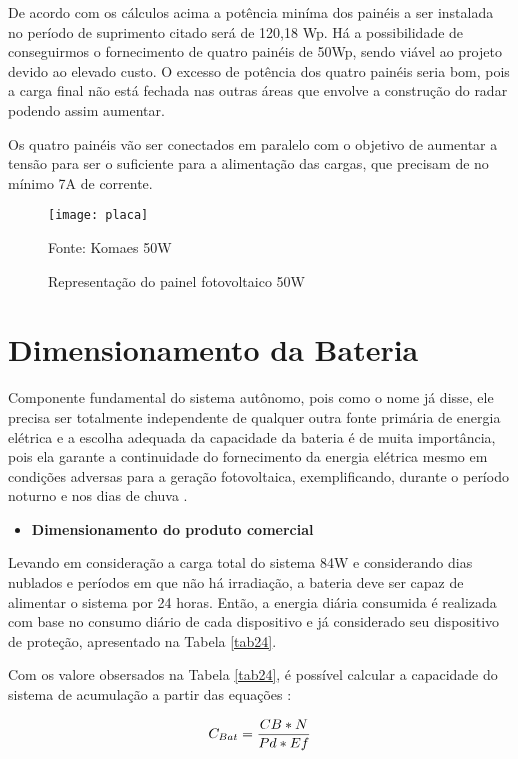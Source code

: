 De acordo com os cálculos acima a potência miníma dos painéis a ser instalada no período de suprimento citado será de 120,18 Wp. Há a possibilidade de conseguirmos o fornecimento de quatro painéis de 50Wp, sendo viável ao projeto devido ao elevado custo. O excesso de potência dos quatro painéis seria bom, pois a carga final não está fechada nas outras áreas que envolve a construção do radar podendo assim aumentar. 

Os quatro painéis vão ser conectados em paralelo com o objetivo de aumentar a tensão para ser o suficiente para a alimentação das cargas, que precisam de no mínimo 7A de corrente. 

\begin{figure}[h!]
\centering
\texttt{[image: placa]}
\caption{Representação do painel fotovoltaico 50W}
Fonte: Komaes 50W
\label{fig:tabela}
\end{figure}

\section{Dimensionamento da Bateria}
Componente fundamental do sistema autônomo, pois como o nome já disse, ele precisa ser totalmente independente de qualquer outra fonte primária de energia elétrica e a escolha adequada da capacidade da bateria é de muita importância, pois ela garante a continuidade do fornecimento da energia elétrica mesmo em condições adversas para a geração fotovoltaica, exemplificando, durante o período noturno e nos dias de chuva \cite{alan}.
\begin{itemize}
 \item\textbf{Dimensionamento do produto comercial}
\end{itemize}
Levando em consideração a carga total do sistema 84W e considerando dias nublados e períodos em que não há irradiação, a bateria deve ser capaz de alimentar o sistema por 24 horas.
Então, a energia diária consumida é realizada com base no consumo diário de cada dispositivo e já considerado seu dispositivo de proteção, apresentado na Tabela \ref{tab24}.

Com os valore obsersados na Tabela \ref{tab24}, é possível calcular a capacidade do sistema de acumulação a partir das equações \cite{alan}:

\begin{equation}
    C_{Bat} = \frac{CB*N}{Pd*Ef}\\
\end{equation}




